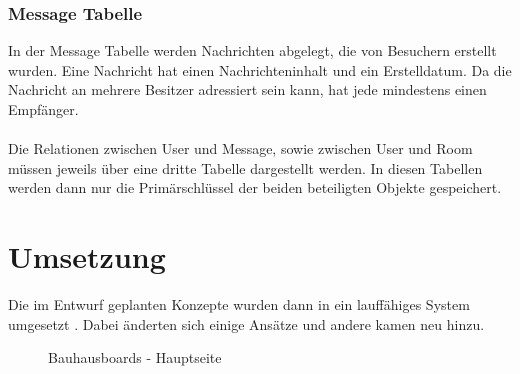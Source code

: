 \subsubsection{Message Tabelle}\label{Message Tabelle}
In der Message Tabelle werden Nachrichten abgelegt, die von Besuchern erstellt wurden. Eine Nachricht hat einen Nachrichteninhalt und ein Erstelldatum. Da die Nachricht an mehrere Besitzer adressiert sein kann, hat jede mindestens einen Empfänger.
\\
\\
Die Relationen zwischen User und Message, sowie zwischen User und Room müssen jeweils über eine dritte Tabelle dargestellt werden. In diesen Tabellen werden dann nur die Primärschlüssel der beiden beteiligten Objekte gespeichert.






















\section{Umsetzung}\label{Umsetzung}
Die im Entwurf geplanten Konzepte wurden dann in ein lauffähiges System umgesetzt . Dabei änderten sich einige Ansätze und andere kamen neu hinzu.
\begin{figure}[h!]
  \centering
  \caption{Bauhausboards - Hauptseite}
  \label{img:finalHauptseite}
\end{figure}

